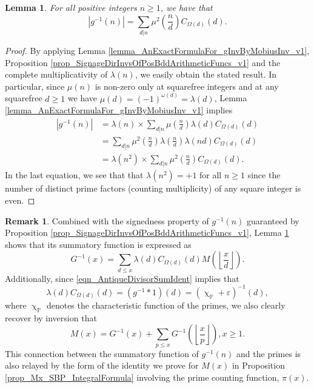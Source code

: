 \documentclass[11pt,reqno,a4letter]{article}
\numberwithin{figure}{section}
\numberwithin{table}{section}
\renewcommand{\chi}{\upchi}
\newcommand{\Floor}[2]{\ensuremath{\left\lfloor \frac{#1}{#2} \right\rfloor}}
\theoremstyle{plain}
\newtheorem{lemma}[theorem]{Lemma}
\numberwithin{theorem}{section}
\theoremstyle{definition}
\newtheorem{remark}[theorem]{Remark}
\begin{document}
\begin{lemma} 
\label{lemma_AbsValueOf_gInvn_FornSquareFree_v1} 
For all positive integers $n \geq 1$, we have that 
\begin{equation} 
\label{eqn_AbsValueOf_gInvn_FornSquareFree_v1} 
|g^{-1}(n)| = \sum_{d|n} \mu^2\left(\frac{n}{d}\right) C_{\Omega(d)}(d). 
\end{equation} 
\end{lemma} 
\begin{proof} 
By applying 
Lemma \ref{lemma_AnExactFormulaFor_gInvByMobiusInv_v1}, 
Proposition \ref{prop_SignageDirInvsOfPosBddArithmeticFuncs_v1} and the 
complete multiplicativity of $\lambda(n)$, 
we easily obtain the stated result. 
In particular, since $\mu(n)$ is non-zero only at squarefree integers and 
at any squarefree $d \geq 1$ we have $\mu(d) = (-1)^{\omega(d)} = \lambda(d)$, 
Lemma \ref{lemma_AnExactFormulaFor_gInvByMobiusInv_v1} implies 
\begin{align*} 
|g^{-1}(n)| & = \lambda(n) \times \sum_{d|n} \mu\left(\frac{n}{d}\right) \lambda(d) C_{\Omega(d)}(d) \\ 
     & = \sum_{d|n} \mu^2\left(\frac{n}{d}\right) \lambda\left(\frac{n}{d}\right) 
     \lambda(nd) C_{\Omega(d)}(d) \\ 
     & = \lambda(n^2) \times \sum_{d|n} \mu^2\left(\frac{n}{d}\right) C_{\Omega(d)}(d). 
\end{align*} 
In the last equation, we see that 
that $\lambda(n^2) = +1$ for all $n \geq 1$ since the number of distinct 
prime factors (counting multiplicity) of any square integer is even. 
\end{proof} 

\begin{remark} 
Combined with the signedness property of $g^{-1}(n)$ guaranteed by 
Proposition \ref{prop_SignageDirInvsOfPosBddArithmeticFuncs_v1}, 
Lemma \ref{lemma_AbsValueOf_gInvn_FornSquareFree_v1} shows that its summatory 
function is expressed as 
\[
G^{-1}(x) = \sum_{d \leq x} \lambda(d) C_{\Omega(d)}(d) M\left(\Floor{x}{d}\right). 
\]
Additionally, since \eqref{eqn_AntiqueDivisorSumIdent} implies that 
$$\lambda(d) C_{\Omega(d)}(d) = (g^{-1} \ast 1)(d) = (\chi_{\mathbb{P}} + \varepsilon)^{-1}(d),$$ 
where $\chi_{\mathbb{P}}$ denotes the characteristic function of the primes, we also clearly 
recover by inversion that 
\[
M(x) = G^{-1}(x) + \sum_{p \leq x} G^{-1}\left(\Floor{x}{p}\right), x \geq 1. 
\]
This connection between the summatory function of $g^{-1}(n)$ and the primes is also relayed 
by the form of the identity we prove for $M(x)$ in 
Proposition \ref{prop_Mx_SBP_IntegralFormula} 
involving the prime counting function, $\pi(x)$. 
\end{remark} 
\end{document}
